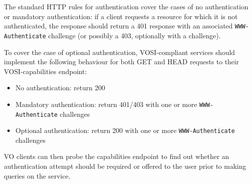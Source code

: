\documentclass[11pt,a4paper]{ivoa}
\newcommand{\header}[1]{{\tt #1}}
\begin{document}
The standard HTTP rules for authentication cover the cases of
no authentication or mandatory authentication:
if a client requests a resource for which it is not authenticated,
the response should return a 401 response with an associated
\header{WWW-Authenticate} challenge
(or possibly a 403, optionally with a challenge).

To cover the case of optional authentication,
VOSI-compliant services should implement the following behaviour
for both GET and HEAD requests to their VOSI-capabilities endpoint:
\begin{itemize}
  \item No authentication:
        return 200
  \item Mandatory authentication:
        return 401/403 with one or more \header{WWW-Authenticate} challenges
  \item Optional authentication:
        return 200 with one or more \header{WWW-Authenticate} challenges
\end{itemize}
VO clients can then probe the capabilities endpoint to find out
whether an authentication attempt should be required or offered
to the user prior to making queries on the service.
\end{document}
